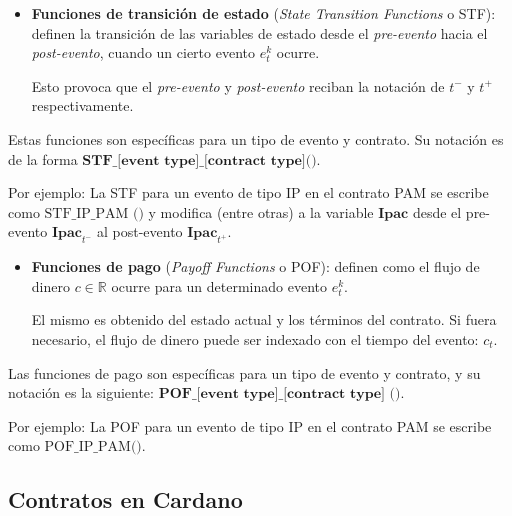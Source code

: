 \documentclass{beamer}
\begin{document}
\begin{frame}
    \begin{itemize}
        \item \textbf{Funciones de transición de estado} (\textit{State Transition Functions} o STF): definen la transición de las variables de estado desde el \textit{pre-evento} hacia el \textit{post-evento}, cuando un cierto evento $e^k_t$ ocurre. 

            Esto provoca que el \textit{pre-evento} y \textit{post-evento} reciban la notación de $t^-$ y $t^+$ respectivamente.

  \end{itemize}
  \pause
  \vfill
  Estas funciones son específicas para un tipo de evento y contrato. Su notación es de la forma $\textbf{STF\_[event type]\_[contract type]()}$.
  \vfill
  \pause

  Por ejemplo: La STF para un evento de tipo IP en el contrato PAM se escribe como $\text{STF\_IP\_PAM ()}$ y modifica (entre otras) a la variable $\textbf{Ipac}$ desde el pre-evento $\textbf{Ipac}_{t^-}$ al post-evento $\textbf{Ipac}_{t^+}$.

\end{frame}

\begin{frame}
    \begin{itemize}
        \item \textbf{Funciones de pago} (\textit{Payoff Functions} o POF): definen como el flujo de dinero $c \in\mathbb{R}$ ocurre para un determinado evento $e^k_t$. 

            El mismo es obtenido del estado actual y los términos del contrato. Si fuera necesario, el flujo de dinero puede ser indexado con el tiempo del evento: $c_t$.
    \end{itemize}
    \pause
    \vfill
    Las funciones de pago son específicas para un tipo de evento y contrato, y su notación es la siguiente: $\textbf{POF\_[event type]\_[contract type] ()}$.
    \vfill
    \pause

    Por ejemplo: La POF para un evento de tipo IP en el contrato PAM se escribe como $\text{POF\_IP\_PAM()}$.

\end{frame}

\subsection{Contratos en Cardano}
\end{document}
